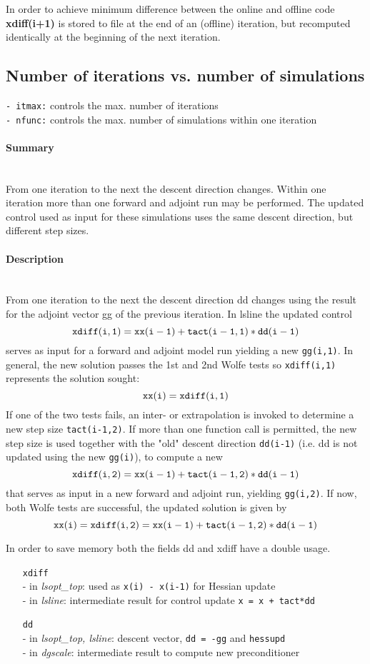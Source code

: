 In order to achieve minimum difference between the online and offline code
{\bf xdiff(i+1)} is stored to file at the end of an (offline) iteration,
but recomputed identically at the beginning of the next iteration.

\subsection{Number of iterations vs. number of simulations}

{\tt - itmax:} controls the max. number of iterations \\
{\tt - nfunc:} controls the max. number of simulations 
within one iteration

\paragraph{Summary} ~ \\
From one iteration to the next the descent direction changes.
Within one iteration more than one forward and adjoint 
run may be performed.
The updated control used as input for these simulations uses the same
descent direction, but different step sizes.

\paragraph{Description} ~ \\
From one iteration to the next the descent direction dd changes using
the result for the adjoint vector gg of the previous iteration.
In lsline the updated control
\[
\tt
xdiff(i,1) = xx(i-1) + tact(i-1,1)*dd(i-1)
\]
serves as input for
a forward and adjoint model run yielding a new {\tt gg(i,1)}.
In general, the new solution passes the 1st and 2nd Wolfe tests 
so {\tt xdiff(i,1)} represents the solution sought:
\[ 
{\tt xx(i) = xdiff(i,1)}
\]
If one of the two tests fails, 
an inter- or extrapolation is invoked to determine
a new step size {\tt tact(i-1,2)}.
If more than one function call is permitted, 
the new step size is used together
with the "old" descent direction {\tt dd(i-1)}
(i.e. dd is not updated using the new {\tt gg(i)}),
to compute a new 
\[
{\tt xdiff(i,2) = xx(i-1) + tact(i-1,2)*dd(i-1)} 
\]
that serves as input
in a new forward and adjoint run, yielding {\tt gg(i,2)}.
If now, both Wolfe tests are successful, 
the updated solution is given by
\[
\tt
xx(i) = xdiff(i,2) = xx(i-1) + tact(i-1,2)*dd(i-1)
\]

In order to save memory both the fields dd and xdiff 
have a double usage.
%
\begin{itemize}
%
\item [{\tt xdiff}] ~\\
- in {\it lsopt\_top}: used as {\tt x(i) - x(i-1)} for Hessian update \\
- in {\it lsline}:    intermediate result for control update 
{\tt x = x + tact*dd}
%
\item [{\tt dd}] ~\\
- in {\it lsopt\_top, lsline}: descent vector, {\tt dd = -gg} 
and {\tt hessupd} \\
- in {\it dgscale}: intermediate result to compute new preconditioner
%
\end{itemize}


